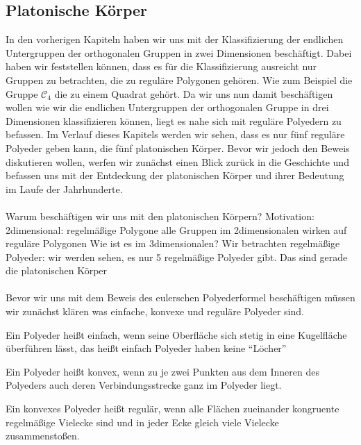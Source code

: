 \subsection{Platonische Körper}
In den vorherigen Kapiteln haben wir uns mit der Klassifizierung der endlichen Untergruppen der orthogonalen Gruppen in zwei Dimensionen beschäftigt. Dabei haben wir feststellen können, dass es für die Klassifizierung ausreicht nur Gruppen zu betrachten, die zu reguläre Polygonen gehören. Wie zum Beispiel die Gruppe $\mathcal{C}_4$ die zu einem Quadrat gehört. Da wir uns nun damit beschäftigen wollen wie wir die endlichen Untergruppen der orthogonalen Gruppe in drei Dimensionen klassifizieren können, liegt es nahe sich mit reguläre Polyedern zu befassen. Im Verlauf dieses Kapitels werden wir sehen, dass es nur fünf reguläre Polyeder geben kann, die fünf platonischen Körper. Bevor wir jedoch den Beweis diskutieren wollen, werfen wir zunächst einen Blick zurück in die Geschichte und befassen uns mit der Entdeckung der platonischen Körper und ihrer Bedeutung im Laufe der Jahrhunderte.\\ \\
Warum beschäftigen wir uns mit den platonischen Körpern?
Motivation: 2dimensional: regelmäßige Polygone
alle Gruppen im 2dimensionalen wirken auf reguläre Polygonen
Wie ist es im 3dimensionalen?
Wir betrachten regelmäßige Polyeder: wir werden sehen, es nur 5 regelmäßige Polyeder gibt. Das sind gerade die platonischen Körper
\\ \\
Bevor wir uns mit dem Beweis des eulerschen Polyederformel beschäftigen müssen wir zunächst klären was einfache, konvexe und reguläre Polyeder sind.
\begin{defi}
	Ein Polyeder heißt einfach, wenn seine Oberfläche sich stetig in eine Kugelfläche überführen lässt, das heißt einfach Polyeder haben keine \enquote{Löcher} \citep[211]{Mainzer1988}
\end{defi}
\begin{defi}
	Ein Polyeder heißt konvex, wenn zu je zwei Punkten aus dem Inneren des Polyeders auch deren Verbindungsstrecke ganz im Polyeder liegt. \citep[51]{Mueller2012}
\end{defi}
\begin{defi}
	Ein konvexes Polyeder heißt regulär, wenn alle Flächen zueinander kongruente regelmäßige Vielecke sind und in jeder Ecke gleich viele Vielecke zusammenstoßen. \citep[51]{Mueller2012}
\end{defi}